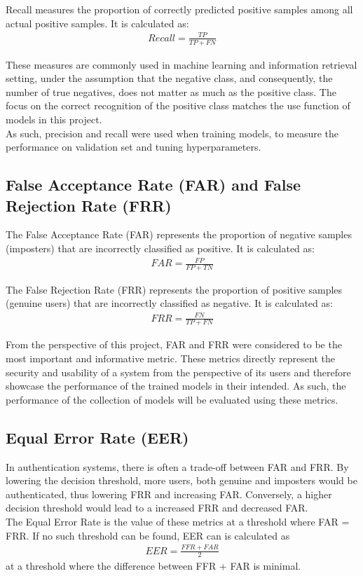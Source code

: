 Recall measures the proportion of correctly predicted positive samples among all actual positive samples. It is calculated as:
\begin{align}
Recall = \frac{TP}{TP + FN}
\end{align}

These measures are commonly used in machine learning and information retrieval setting, under the assumption that the negative class, and consequently, the number of true negatives, does not matter as much as the positive class. The focus on the correct recognition of the positive class matches the use function of models in this project.\\
As such, precision and recall were used when training models, to measure the performance on validation set and tuning hyperparameters.

\subsection{False Acceptance Rate (FAR) and False Rejection Rate (FRR)} \label{FAR_FRR_theory}
The False Acceptance Rate (FAR) represents the proportion of negative samples (imposters) that are incorrectly classified as positive. It is calculated as:
\begin{align}
FAR = \frac{FP}{FP + TN}
\end{align}

The False Rejection Rate (FRR) represents the proportion of positive samples (genuine users) that are incorrectly classified as negative. It is calculated as:
\begin{align}
FRR = \frac{FN}{TP + FN}
\end{align}

From the perspective of this project, FAR and FRR were considered to be the most important and informative metric. These metrics directly represent the security and usability of a system from the perspective of its users and therefore showcase the performance of the trained models in their intended. As such, the performance of the collection of models will be evaluated using these metrics. 

\subsection{Equal Error Rate (EER)}
In authentication systems, there is often a trade-off between FAR and FRR. By lowering the decision threshold, more users, both genuine and imposters would be authenticated, thus lowering FRR and increasing FAR. Conversely, a higher decision threshold would lead to a increased FRR and decreased FAR. \\
The Equal Error Rate is the value of these metrics at a threshold where FAR = FRR. If no such threshold can be found, EER can is calculated as  
\begin{align}
EER = \frac{FFR + FAR}{2}
\end{align}
at a threshold where the difference between FFR + FAR is minimal.

